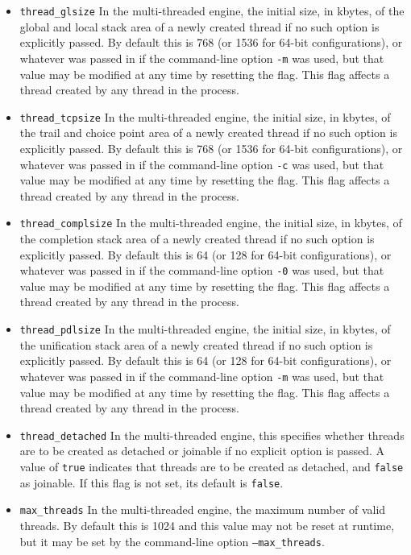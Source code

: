 \begin{description}
\begin{itemize}
\item {\tt thread\_glsize} In the multi-threaded engine, the initial
  size, in kbytes, of the global and local stack area of a newly
  created thread if no such option is explicitly passed.  By default
  this is 768 (or 1536 for 64-bit configurations), or whatever was
  passed in if the command-line option {\tt -m} was used, but that
  value may be modified at any time by resetting the flag.  This flag
  affects a thread created by any thread in the process.

\item {\tt thread\_tcpsize} In the multi-threaded engine, the initial
  size, in kbytes, of the trail and choice point area of a newly
  created thread if no such option is explicitly passed.  By default
  this is 768 (or 1536 for 64-bit configurations), or whatever was
  passed in if the command-line option {\tt -c} was used, but that
  value may be modified at any time by resetting the flag.  This flag
  affects a thread created by any thread in the process.

\item {\tt thread\_complsize} In the multi-threaded engine, the
  initial size, in kbytes, of the completion stack area of a newly
  created thread if no such option is explicitly passed.  By default
  this is 64 (or 128 for 64-bit configurations), or whatever was
  passed in if the command-line option {\tt -0} was used, but that
  value may be modified at any time by resetting the flag.  This flag
  affects a thread created by any thread in the process.

\item {\tt thread\_pdlsize} In the multi-threaded engine, the initial
  size, in kbytes, of the unification stack area of a newly created
  thread if no such option is explicitly passed.  By default this is
  64 (or 128 for 64-bit configurations), or whatever was passed in if
  the command-line option {\tt -m} was used, but that value may be
  modified at any time by resetting the flag.  This flag affects a
  thread created by any thread in the process.

\item {\tt thread\_detached} In the multi-threaded engine, this
  specifies whether threads are to be created as detached or joinable
  if no explicit option is passed.  A value of {\tt true} indicates
  that threads are to be created as detached, and {\tt false} as
  joinable.  If this flag is not set, its default is {\tt false}.

\item {\tt max\_threads} In the multi-threaded engine, the maximum
  number of valid threads.  By default this is 1024 and this value may
  not be reset at runtime, but it may be set by the command-line
  option {\tt --max\_threads}.


\end{itemize}
\end{description}
